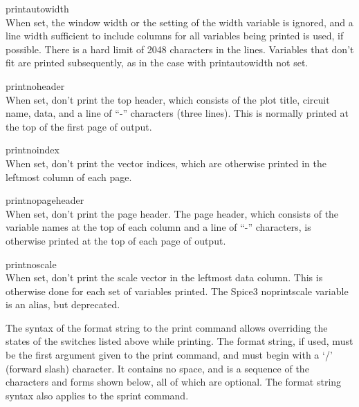 \begin{description}
\item{\et printautowidth}\\
When set, the window width or the setting of the {\et width} variable
is ignored, and a line width sufficient to include columns for all
variables being printed is used, if possible.  There is a hard limit
of 2048 characters in the lines.  Variables that don't fit are printed
subsequently, as in the case with {\et printautowidth} not set.

\item{\et printnoheader}\\
When set, don't print the top header, which consists of the plot
title, circuit name, data, and a line of ``{\vt -}'' characters (three
lines).  This is normally printed at the top of the first page of
output.

\item{\et printnoindex}\\
When set, don't print the vector indices, which are otherwise printed
in the leftmost column of each page.

\item{\et printnopageheader}\\
When set, don't print the page header.  The page header, which
consists of the variable names at the top of each column and a line of
``{\vt -}'' characters, is otherwise printed at the top of each page
of output.

\item{\et printnoscale}\\
When set, don't print the scale vector in the leftmost data column. 
This is otherwise done for each set of variables printed.  The Spice3
{\et noprintscale} variable is an alias, but deprecated.
\end{description}


The syntax of the format string to the {\cb print} command allows
overriding the states of the switches listed above while printing. 
The format string, if used, must be the first argument given to the
{\cb print} command, and must begin with a `{\vt /}' (forward slash)
character.  It contains no space, and is a sequence of the characters
and forms shown below, all of which are optional.  The format string
syntax also applies to the {\cb sprint} command.

